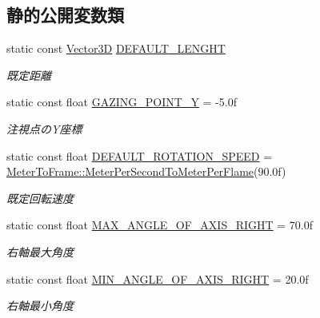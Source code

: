\subsection*{静的公開変数類}
\begin{DoxyCompactItemize}
\item 
static const \mbox{\hyperlink{class_vector3_d}{Vector3D}} \mbox{\hyperlink{class_camera_state___homing_target_ab96ca0ef3a0b7f125fcee847556ff4a9}{D\+E\+F\+A\+U\+L\+T\+\_\+\+L\+E\+N\+G\+HT}}
\begin{DoxyCompactList}\small\item\em 既定距離 \end{DoxyCompactList}\item 
static const float \mbox{\hyperlink{class_camera_state___homing_target_ae8a54798d3c4146d4f01f105d205bfee}{G\+A\+Z\+I\+N\+G\+\_\+\+P\+O\+I\+N\+T\+\_\+Y}} = -\/5.\+0f
\begin{DoxyCompactList}\small\item\em 注視点の\+Y座標 \end{DoxyCompactList}\item 
static const float \mbox{\hyperlink{class_camera_state___homing_target_a8ce38d16884dc79cc100f176cfe6fde7}{D\+E\+F\+A\+U\+L\+T\+\_\+\+R\+O\+T\+A\+T\+I\+O\+N\+\_\+\+S\+P\+E\+ED}} = \mbox{\hyperlink{class_meter_to_frame_aa5468938f59eb934bfc6a897a7513812}{Meter\+To\+Frame\+::\+Meter\+Per\+Second\+To\+Meter\+Per\+Flame}}(90.\+0f)
\begin{DoxyCompactList}\small\item\em 既定回転速度 \end{DoxyCompactList}\item 
static const float \mbox{\hyperlink{class_camera_state___homing_target_a04e0008dcb613ee302e8c6ffdbd3dad8}{M\+A\+X\+\_\+\+A\+N\+G\+L\+E\+\_\+\+O\+F\+\_\+\+A\+X\+I\+S\+\_\+\+R\+I\+G\+HT}} = 70.\+0f
\begin{DoxyCompactList}\small\item\em 右軸最大角度 \end{DoxyCompactList}\item 
static const float \mbox{\hyperlink{class_camera_state___homing_target_a39a0390c41c817f1809068b527939f4c}{M\+I\+N\+\_\+\+A\+N\+G\+L\+E\+\_\+\+O\+F\+\_\+\+A\+X\+I\+S\+\_\+\+R\+I\+G\+HT}} = 20.\+0f
\begin{DoxyCompactList}\small\item\em 右軸最小角度 \end{DoxyCompactList}\end{DoxyCompactItemize}
